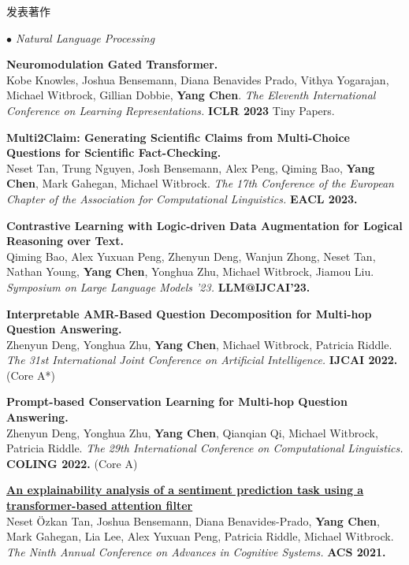 \documentclass{resume} %
\begin{document}
\begin{rSection}{发表著作}
\begin{rSubsection}{\large\em $\bullet$ Natural Language Processing}{}{}{}
	\item {\bf Neuromodulation Gated Transformer.}\\
Kobe Knowles, Joshua Bensemann, Diana Benavides Prado, Vithya Yogarajan, Michael Witbrock, Gillian Dobbie, \textbf{Yang Chen}. {\em The Eleventh International Conference on Learning Representations.} {\bf ICLR 2023} Tiny Papers.\\
	\item {\bf Multi2Claim: Generating Scientific Claims from Multi-Choice Questions for Scientific Fact-Checking.}\\
Neset Tan, Trung Nguyen, Josh Bensemann, Alex Peng, Qiming Bao, \textbf{Yang Chen}, Mark Gahegan, Michael Witbrock. {\em The 17th Conference of the European Chapter of the Association for Computational Linguistics.} {\bf EACL 2023.}\\
	\item {\bf Contrastive Learning with Logic-driven Data Augmentation for Logical Reasoning over Text.}\\
Qiming Bao, Alex Yuxuan Peng, Zhenyun Deng, Wanjun Zhong, Neset Tan, Nathan Young, \textbf{Yang Chen}, Yonghua Zhu, Michael Witbrock, Jiamou Liu. {\em Symposium on Large Language Models \@IJCAI'23.} {\bf LLM@IJCAI'23.}\\
	\item {\bf Interpretable AMR-Based Question Decomposition for Multi-hop Question Answering.}\\
		Zhenyun Deng, Yonghua Zhu, \textbf{Yang Chen}, Michael Witbrock, Patricia Riddle. {\em The 31st International Joint Conference on Artificial Intelligence.} \textbf{IJCAI 2022.} (Core A*)\\
	\item {\bf Prompt-based Conservation  Learning for Multi-hop Question Answering.}\\
Zhenyun Deng, Yonghua Zhu, \textbf{Yang Chen}, Qianqian Qi, Michael Witbrock, Patricia Riddle. {\em The 29th International Conference on Computational Linguistics.} \textbf{COLING 2022.} (Core A)\\
\item {\href{https://advancesincognitivesystems.github.io/acs2021/data/ACS-21_paper_22.pdf}{\bf An explainability analysis of a sentiment prediction task using a transformer-based attention filter}}\\
		Neset \"{O}zkan Tan, Joshua Bensemann, Diana Benavides-Prado, \textbf{Yang Chen}, Mark Gahegan, Lia Lee, Alex Yuxuan Peng, Patricia Riddle, Michael Witbrock. {\em The Ninth Annual Conference on Advances in Cognitive Systems.} \textbf{ACS 2021.}\\
\end{rSubsection}



\end{rSection}
\end{document}

